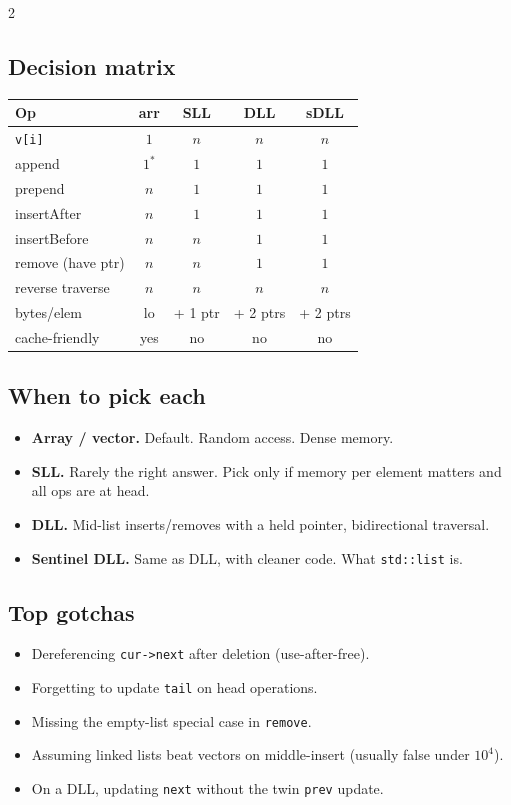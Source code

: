 \documentclass[10pt]{article}
\begin{document}
\begin{multicols}{2}
\subsection*{Decision matrix}
\begin{tabular}{@{}l|cccc@{}}
\textbf{Op} & \textbf{arr} & \textbf{SLL} & \textbf{DLL} & \textbf{sDLL}\\
\hline
\texttt{v[i]}         & $1$ & $n$ & $n$ & $n$\\
append                & $1^*$ & $1$ & $1$ & $1$\\
prepend               & $n$ & $1$ & $1$ & $1$\\
insertAfter           & $n$ & $1$ & $1$ & $1$\\
insertBefore          & $n$ & $n$ & $1$ & $1$\\
remove (have ptr)     & $n$ & $n$ & $1$ & $1$\\
reverse traverse      & $n$ & $n$ & $n$ & $n$\\
bytes/elem            & lo  & + 1 ptr & + 2 ptrs & + 2 ptrs\\
cache-friendly        & yes & no  & no  & no
\end{tabular}

\subsection*{When to pick each}
\begin{itemize}
    \item \textbf{Array / vector.} Default. Random access. Dense
    memory.
    \item \textbf{SLL.} Rarely the right answer. Pick only if memory
    per element matters and all ops are at head.
    \item \textbf{DLL.} Mid-list inserts/removes with a held pointer,
    bidirectional traversal.
    \item \textbf{Sentinel DLL.} Same as DLL, with cleaner code. What
    \texttt{std::list} is.
\end{itemize}

\subsection*{Top gotchas}
\begin{itemize}
    \item Dereferencing \texttt{cur->next} after deletion (use-after-free).
    \item Forgetting to update \texttt{tail} on head operations.
    \item Missing the empty-list special case in \texttt{remove}.
    \item Assuming linked lists beat vectors on middle-insert (usually
    false under $10^4$).
    \item On a DLL, updating \texttt{next} without the twin
    \texttt{prev} update.
\end{itemize}

\end{multicols}
\end{document}
